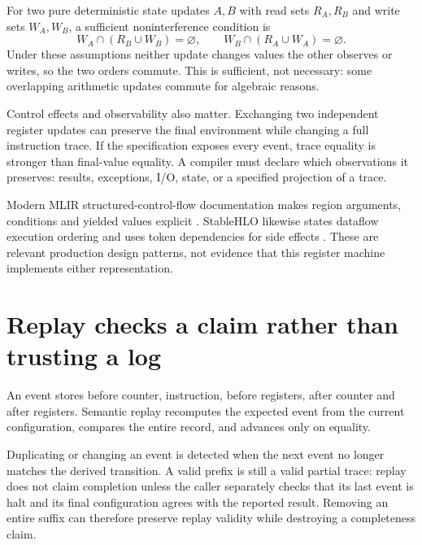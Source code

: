 For two pure deterministic state updates $A,B$ with read sets $R_A,R_B$
and write sets $W_A,W_B$, a sufficient noninterference condition is
\begin{equation}
 W_A\cap(R_B\cup W_B)=\varnothing,\qquad
 W_B\cap(R_A\cup W_A)=\varnothing.
 \label{eq:commute}
\end{equation}
Under these assumptions neither update changes values the other observes
or writes, so the two orders commute. This is sufficient, not necessary:
some overlapping arithmetic updates commute for algebraic reasons.

Control effects and observability also matter. Exchanging two independent
register updates can preserve the final environment while changing a full
instruction trace. If the specification exposes every event, trace equality
is stronger than final-value equality. A compiler must declare which
observations it preserves: results, exceptions, I/O, state, or a specified
projection of a trace.

Modern MLIR structured-control-flow documentation makes region arguments,
conditions and yielded values explicit \cite{mlir}. StableHLO likewise states
dataflow execution ordering and uses token dependencies for side effects
\cite{stablehlo}. These are relevant production design patterns, not evidence
that this register machine implements either representation.

\section{Replay checks a claim rather than trusting a log}
An event stores before counter, instruction, before registers, after counter
and after registers. Semantic replay recomputes the expected event from the
current configuration, compares the entire record, and advances only on equality.

Duplicating or changing an event is detected when the next event no longer
matches the derived transition. A valid prefix is still a valid partial trace:
replay does not claim completion unless the caller separately checks that its
last event is halt and its final configuration agrees with the reported result.
Removing an entire suffix can therefore preserve replay validity while destroying
a completeness claim.

